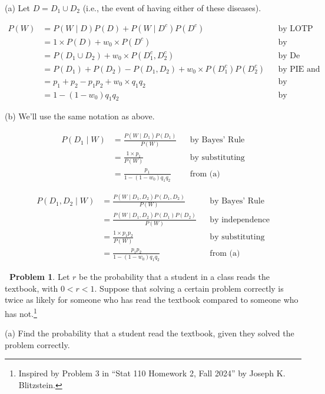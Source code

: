 \documentclass[12pt,oneside]{article}
\theoremstyle{definition}
\newtheorem{problem}{\faPen \ Problem}
\theoremstyle{remark}
\begin{document}
\begin{solutionbox}
(a) Let $D = D_1 \cup D_2$ (i.e., the event of having either of these diseases).

\[
\begin{aligned}
P(W) &= P(W \mid D) P(D) + P(W \mid D^c) P(D^c) && \text{by LOTP} \\
&= 1 \times P(D) + w_0 \times P(D^c) && \text{by substituting} \\
&= P(D_1 \cup D_2) + w_0 \times P(D_1^c, D_2^c) && \text{by De Morgan's Laws} \\
&= P(D_1) + P(D_2) - P(D_1, D_2) + w_0 \times P(D_1^c) P(D_2^c) && \text{by PIE and independence} \\
&= p_1 + p_2 - p_1 p_2 + w_0 \times q_1 q_2 && \text{by substituting} \\
&= 1 - (1 - w_0) q_1 q_2 && \text{by simplifying}
\end{aligned}
\]

(b) We'll use the same notation as above.

\[
\begin{aligned}
P(D_1 \mid W) &= \frac{P(W \mid D_1) P(D_1)}{P(W)} && \text{by Bayes' Rule} \\
&= \frac{1 \times p_1}{P(W)} && \text{by substituting} \\
&= \frac{p_1}{1 - (1 - w_0) q_1 q_2} && \text{from (a)}
\end{aligned}
\]

\[
\begin{aligned}
P(D_1, D_2 \mid W) &= \frac{P(W \mid D_1, D_2) P(D_1, D_2)}{P(W)} && \text{by Bayes' Rule} \\
&= \frac{P(W \mid D_1, D_2) P(D_1) P(D_2)}{P(W)} && \text{by independence} \\
&= \frac{1 \times p_1 p_2}{P(W)} && \text{by substituting} \\
&= \frac{p_1 p_2}{1 - (1 - w_0) q_1 q_2} && \text{from (a)}
\end{aligned}
\]
\end{solutionbox}

\begin{problem}
Let $r$ be the probability that a student in a class reads the textbook, with $0 < r < 1$. Suppose that solving a certain problem correctly is twice as likely for someone who has read the textbook compared to someone who has not.\footnote{Inspired by Problem 3 in \enquote{Stat 110 Homework 2, Fall 2024} by Joseph K. Blitzstein.}
 
(a) Find the probability that a student read the textbook, given they solved the problem correctly.
\end{problem}
\end{document}
